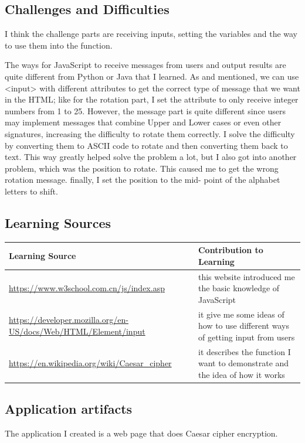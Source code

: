 \documentclass[a4paper, 11pt]{report}
\begin{document}
\subsection{Challenges and Difficulties}

I think the challenge parts are receiving inputs, setting the variables and the way to use them into the function. 

The ways for JavaScript to receive messages from users and output results are quite different from Python or Java 
that I learned. As \cite{input} and \cite{w3school} mentioned, we can use <input> with different attributes to 
get the correct type of message that we want in the HTML; like for the rotation part, I set the attribute to only 
receive integer numbers from 1 to 25. However, the message part is quite different since users may implement 
messages that combine Upper and Lower cases or even other signatures, increasing the difficulty to rotate them 
correctly. I solve the difficulty by converting them to ASCII code to rotate and then converting them back to 
text. This way greatly helped solve the problem a lot, but I also got into another problem, which was the 
position to rotate. This caused me to get the wrong rotation message. finally, I set the position to the mid-
point of the alphabet letters to shift.

\subsection{Learning Sources}

\begin{tabular}{|p{}|p{}|}
	\hline
	Learning Source  & Contribution to Learning\\
	\hline
	\url{https://www.w3school.com.cn/js/index.asp} & this website introduced me the basic knowledge of JavaScript\\
	\hline
	\url{https://developer.mozilla.org/en-US/docs/Web/HTML/Element/input} & it give me some ideas of how to use different ways of getting input from users\\
	\hline
	\url{https://en.wikipedia.org/wiki/Caesar_cipher} & it describes the function I want to demonstrate and the idea of how it works\\
	\hline
\end{tabular}

\subsection{Application artifacts}
The application I created is a web page that does Caesar cipher encryption.
\end{document}
